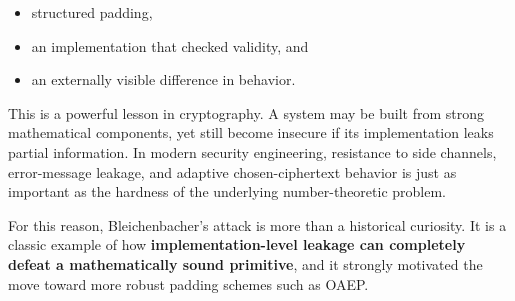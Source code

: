 \begin{itemize}
\item structured padding,
\item an implementation that checked validity, and
\item an externally visible difference in behavior.
\end{itemize}

This is a powerful lesson in cryptography. A system may be built from strong mathematical components, yet still become insecure if its implementation leaks partial information. In modern security engineering, resistance to side channels, error-message leakage, and adaptive chosen-ciphertext behavior is just as important as the hardness of the underlying number-theoretic problem.

For this reason, Bleichenbacher's attack is more than a historical curiosity. It is a classic example of how \textbf{implementation-level leakage can completely defeat a mathematically sound primitive}, and it strongly motivated the move toward more robust padding schemes such as OAEP.
